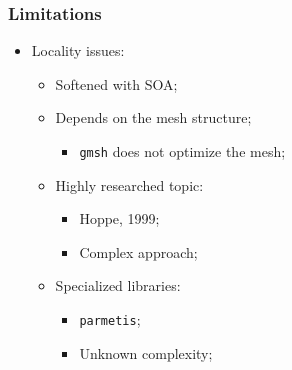 \begin{frame}
	\frametitle{Limitations}
	\begin{itemize}
		\vfill
		\item Locality issues:
		\vfill
		\begin{itemize}
			\item Softened with SOA;
			\vfill
			\item Depends on the mesh structure;
			\begin{itemize}
				\item \texttt{gmsh} does not optimize the mesh;
			\end{itemize}
			\vfill
			\item Highly researched topic:
			\begin{itemize}
				\item Hoppe, 1999;
				\item Complex approach;
			\end{itemize}
			\vfill
			\item Specialized libraries:
			\begin{itemize}
				\item \texttt{parmetis};
				\item Unknown complexity;
			\end{itemize}
		\end{itemize}
	\end{itemize}
\end{frame}
